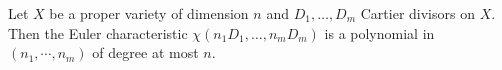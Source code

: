     



    \begin{lemma}\label{lem:Hilbert_polynomial}
        Let \(X\) be a proper variety of dimension \(n\) and \(D_1,\ldots,D_m\) Cartier divisors on \(X\).
        Then the Euler characteristic \(\chi(n_1D_1,\ldots,n_mD_m)\) is a polynomial in \((n_1,\cdots,n_m)\) of degree at most \(n\).
    \end{lemma}

